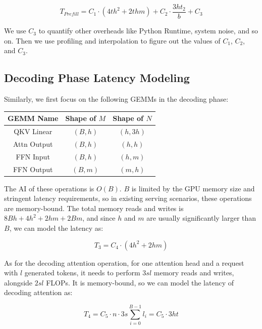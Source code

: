 $$T_{Prefill} = C_1 \cdot (4th^2 + 2thm) + C_2 \cdot \frac{3ht_2}{b} + C_3$$

We use $C_3$ to quantify other overheads like Python Runtime, system noise, and so on. Then we use profiling and interpolation to figure out the values of $C_1$, $C_2$, and $C_3$.

\subsection{Decoding Phase Latency Modeling}

Similarly, we first focus on the following GEMMs in the decoding phase:

\begin{table}[h]
\centering
\begin{tabular}{|c|c|c|}
    \hline
    GEMM Name & Shape of $M$ & Shape of $N$ \\ \hline
    QKV Linear & $(B, h)$ & $(h, 3h)$ \\ \hline
    Attn Output & $(B, h)$ & $(h, h)$ \\ \hline
    FFN Input & $(B, h)$ & $(h, m)$ \\ \hline
    FFN Output & $(B, m)$ & $(m, h)$ \\ \hline
\end{tabular}
\end{table}

The AI of these operations is $O(B)$. $B$ is limited by the GPU memory size and stringent latency requirements, so in existing serving scenarios, these operations are memory-bound. The total memory reads and writes is $8Bh + 4h^2 + 2hm + 2Bm$, and since $h$ and $m$ are usually significantly larger than $B$, we can model the latency as:

$$T_3 = C_4 \cdot (4h^2 + 2hm)$$

As for the decoding attention operation, for one attention head and a request with $l$ generated tokens, it needs to perform $3sl$ memory reads and writes, alongside $2sl$ FLOPs. It is memory-bound, so we can model the latency of decoding attention as:

$$T_4 = C_5 \cdot n \cdot 3s \sum_{i=0}^{B-1} l_i = C_5 \cdot 3ht$$


